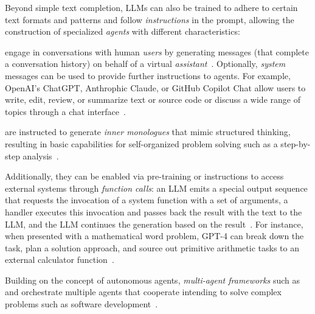 Beyond simple text completion, LLMs can also be trained to adhere to certain text formats and patterns and follow \emph{instructions} in the prompt, allowing the construction of specialized \emph{agents} with different characteristics:
%
\begin{description}[noextralabelsep]
	\item[Conversational agents] engage in conversations with human \emph{users} by generating messages (that complete a conversation history) on behalf of a virtual \emph{assistant}~\cite{bai2022training}.
	Optionally, \emph{system} messages can be used to provide further instructions to agents.
	For example, OpenAI's ChatGPT, Anthrophic Claude, or GitHub Copilot Chat allow users to write, edit, review, or summarize text or source code or discuss a wide range of topics through a chat interface~\cite{openai2024gpt4}.

	\item[Autonomous agents] are instructed to generate \emph{inner monologues} that mimic structured thinking, resulting in basic capabilities for self-organized problem solving such as a step-by-step analysis~\cite{yang2023autogpt}.

	Additionally, they can be enabled via pre-training or instructions to access external systems through \emph{function calls}: an LLM emits a special output sequence that requests the invocation of a system function with a set of arguments, a handler executes this invocation and passes back the result with the text to the LLM, and the LLM continues the generation based on the result~\cite{hao2023toolkengpt,mialon2023augmented,yang2023autogpt}.
	For instance, when presented with a mathematical word problem, GPT-4 can break down the task, plan a solution approach, and source out primitive arithmetic tasks to an external calculator function~\cite{openai2024gpt4}.

	Building on the concept of autonomous agents, \emph{multi-agent frameworks} such as  and  orchestrate multiple agents that cooperate intending to solve complex problems such as software development~\cite{hong2023metagpt,qian2023communicative}.
\end{description}

